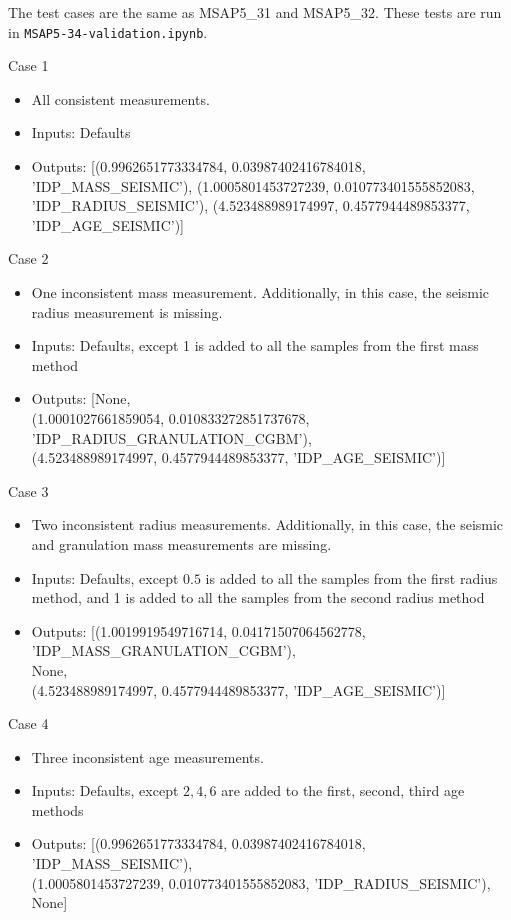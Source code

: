\documentclass[a4paper, oneside, 11pt, article, english]{memoir}
\begin{document}
The test cases are the same as MSAP5\_31 and MSAP5\_32.  These tests are run in \texttt{MSAP5-34-validation.ipynb}. 

Case 1
  \begin{itemize}
      \firmlist
      \item All consistent measurements. 
      \item Inputs: Defaults
      \item Outputs: [(0.9962651773334784, 0.03987402416784018, 'IDP\_MASS\_SEISMIC'), (1.0005801453727239, 0.010773401555852083, 'IDP\_RADIUS\_SEISMIC'), (4.523488989174997, 0.4577944489853377, 'IDP\_AGE\_SEISMIC')]
  \end{itemize}

Case 2
  \begin{itemize}
      \firmlist
      \item One inconsistent mass measurement. Additionally, in this case, the seismic radius measurement is missing.
      \item Inputs: Defaults, except 1 is added to all the samples from the first mass method
      \item Outputs: [None, \\
                      (1.0001027661859054, 0.010833272851737678, 'IDP\_RADIUS\_GRANULATION\_CGBM'), \\(4.523488989174997, 0.4577944489853377, 'IDP\_AGE\_SEISMIC')]
  \end{itemize}

Case 3
  \begin{itemize}
      \firmlist
      \item Two inconsistent radius measurements. Additionally, in this case, the seismic and granulation mass measurements are missing. 
      \item Inputs: Defaults, except $0.5$ is added to all the samples from the first radius method, and 1 is added to all the samples from the second radius method
      \item Outputs: [(1.0019919549716714, 0.04171507064562778, 'IDP\_MASS\_GRANULATION\_CGBM'), \\
                      None, \\
                      (4.523488989174997, 0.4577944489853377, 'IDP\_AGE\_SEISMIC')]
  \end{itemize}

Case 4
  \begin{itemize}
      \firmlist
      \item Three inconsistent age measurements. 
      \item Inputs: Defaults, except $2,4,6$ are added to the first, second, third age methods 
      \item Outputs: [(0.9962651773334784, 0.03987402416784018, 'IDP\_MASS\_SEISMIC'), \\
                      (1.0005801453727239, 0.010773401555852083, 'IDP\_RADIUS\_SEISMIC'), \\
                      None]
  \end{itemize}
\end{document}
